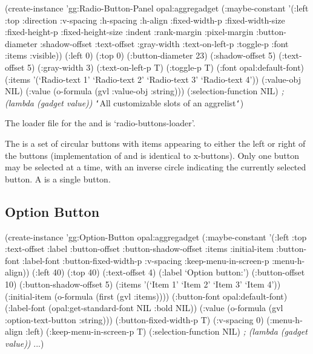 \begin{group}
\begin{programexample}
(create-instance 'gg:Radio-Button-Panel opal:aggregadget
   (:maybe-constant '(:left :top :direction :v-spacing :h-spacing :h-align
                      :fixed-width-p :fixed-width-size :fixed-height-p :fixed-height-size
                      :indent :rank-margin :pixel-margin :button-diameter :shadow-offset
                      :text-offset :gray-width :text-on-left-p :toggle-p :font
                      :items :visible))
   (:left 0)
   (:top 0)
   (:button-diameter 23)
   (:shadow-offset 5)
   (:text-offset 5)
   (:gray-width 3)
   (:text-on-left-p T)
   (:toggle-p T)
   (:font opal:default-font)
   (:items '(`Radio-text 1' `Radio-text 2' `Radio-text 3' `Radio-text 4'))
   (:value-obj NIL)
   (:value (o-formula (gvl :value-obj :string)))
   (:selection-function NIL)   {\it ; (lambda (gadget value))}
   {\tt\char`\<}All customizable slots of an aggrelist{\tt\char`\>})
\end{programexample}
\end{group}

\vspace{1 line}
The loader file for the  and  is
`radio-buttons-loader'.

The  is a set of circular buttons with items
appearing to either the left or right of the buttons (implementation
of  and  is identical to
x-buttons).  Only one button may be selected at a time, with an
inverse circle indicating the currently selected button.  A
 is a single button.


\begin{group}
\section{Option Button}
\label{option-button}

\begin{programexample}
(create-instance 'gg:Option-Button opal:aggregadget
  (:maybe-constant '(:left :top :text-offset :label :button-offset :button-shadow-offset
                     :items :initial-item :button-font :label-font :button-fixed-width-p
                     :v-spacing :keep-menu-in-screen-p :menu-h-align))
  (:left 40) (:top 40)
  (:text-offset 4)
  (:label `Option button:')
  (:button-offset 10)
  (:button-shadow-offset 5)
  (:items '(`Item 1' `Item 2' `Item 3' `Item 4'))
  (:initial-item (o-formula (first (gvl :items))))
  (:button-font opal:default-font)
  (:label-font (opal:get-standard-font NIL :bold NIL))
  (:value (o-formula (gvl :option-text-button :string)))
  (:button-fixed-width-p T)
  (:v-spacing 0)
  (:menu-h-align :left)
  (:keep-menu-in-screen-p T)
  (:selection-function NIL)   {\it ; (lambda (gadget value))}
  ...)
\end{programexample}
\end{group}

